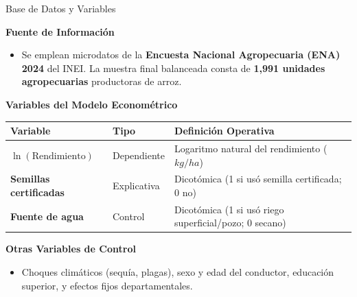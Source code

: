 \documentclass[t]{beamer}
\begin{document}
\begin{frame}[t]{Base de Datos y Variables}
\hspace{0.2cm}
\begin{minipage}{0.92\textwidth}
\vspace{-0.4cm}

    \textbf{Fuente de Información}
    \vspace{0.05cm}
        \begin{itemize}
            \justifying
            \item Se emplean microdatos de la \textbf{Encuesta Nacional Agropecuaria (ENA) 2024} del INEI. La muestra final balanceada consta de \textbf{1,991 unidades agropecuarias} productoras de arroz.
        \end{itemize}
        
    \vspace{0.05cm}
    \textbf{Variables del Modelo Econométrico}
    \vspace{0.05cm}
    \begin{center}
        \footnotesize
        \renewcommand{\arraystretch}{1.12}
        \begin{tabular}{|>{\arraybackslash}m{3.1cm}|>{\centering\arraybackslash}m{1.9cm}|>{\arraybackslash}m{4.3cm}|}
        \hline
        \textbf{Variable} & \textbf{Tipo} & \textbf{Definición Operativa} \\
        \hline
        $\ln(\text{Rendimiento})$ & Dependiente & Logaritmo natural del rendimiento ($kg/ha$) \\
        \hline
        \textbf{Semillas certificadas} & Explicativa & Dicotómica (1 si usó semilla certificada; 0 no) \\
        \hline
        \textbf{Fuente de agua} & Control & Dicotómica (1 si usó riego superficial/pozo; 0 secano) \\
        \hline
        \end{tabular}
    \end{center}

    \vspace{-0.1cm}
    \textbf{Otras Variables de Control}
        \begin{itemize}
            \justifying
            \item Choques climáticos (sequía, plagas), sexo y edad del conductor, educación superior, y efectos fijos departamentales.
        \end{itemize}

\end{minipage}
\end{frame}
\end{document}

